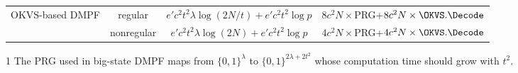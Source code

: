 \begin{table*}
\begin{threeparttable}
\begin{tabular}{cccc}
            \multirow{2}{*}{OKVS-based DMPF} & regular & $e'c^2t^2\lambda\log(2N/t)+e'c^2t^2\log p$ & $8c^2N\times$PRG+$8c^2N\times\OKVS.\Decode$  \\
            & nonregular & $e'c^2t^2\lambda\log(2N)+e'c^2t^2\log p$ & $4c^2N\times$PRG+$4c^2N\times\OKVS.\Decode$\\
            \bottomrule
		\end{tabular}
    \begin{tablenotes}
      \item [1] The PRG used in big-state DMPF maps from $\{0,1\}^\lambda$ to $\{0,1\}^{2\lambda+2t^2}$ whose computation time should grow with $t^2$. 
    \end{tablenotes}
  \end{threeparttable}
\end{table*}
 \fi